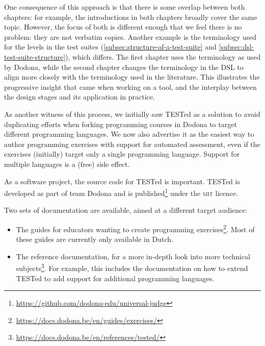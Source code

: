 \documentclass[./main]{subfiles}
\begin{document}
One consequence of this approach is that there is some overlap between both chapters: for example, the introductions in both chapters broadly cover the same topic.
However, the focus of both is different enough that we feel there is no problem: they are not verbatim copies.
Another example is the terminology used for the levels in the test suites (\cref{subsec:structure-of-a-test-suite} and \cref{subsec:dsl-test-suite-structure}), which differs.
The first chapter uses the terminology as used by Dodona, while the second chapter changes the terminology in the DSL to align more closely with the terminology used in the literature.
This illustrates the progressive insight that came when working on a tool, and the interplay between the design stages and its application in practice.

As another witness of this process, we initially saw TESTed as a solution to avoid duplicating efforts when forking programming courses in Dodona to target different programming languages.
We now also advertise it as the easiest way to author programming exercises with support for automated assessment, even if the exercises (initially) target only a single programming language.
Support for multiple languages is a (free) side effect.

As a software project, the source code for TESTed is important.
TESTed is developed as part of team Dodona and is published\footnote{\url{https://github.com/dodona-edu/universal-judge}} under the \textsc{mit} licence.

Two sets of documentation are available, aimed at a different target audience:

\begin{itemize}
    \item The guides for educators wanting to create programming exercises\footnote{\url{https://docs.dodona.be/en/guides/exercises/}}.
          Most of these guides are currently only available in Dutch.
    \item The reference documentation, for a more in-depth look into more technical subjects\footnote{\url{https://docs.dodona.be/en/references/tested/}}.
          For example, this includes the documentation on how to extend TESTed to add support for additional programming languages.
\end{itemize}
\end{document}
